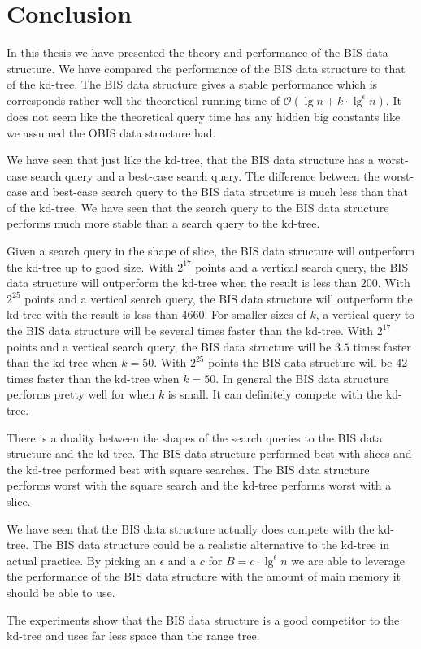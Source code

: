 \chapter{Conclusion}
\label{ch:conclusion}

In this thesis we have presented the theory and performance of the BIS data structure. We have compared the performance of the BIS data structure to that of the kd-tree. The BIS data structure gives a stable performance which is corresponds rather well the theoretical running time of $\mathcal{O}(\lg n + k\cdot\lg^\epsilon n)$. It does not seem like the theoretical query time has any hidden big constants like we assumed the OBIS data structure had.

We have seen that just like the kd-tree, that the BIS data structure has a worst-case search query and a best-case search query. The difference between the worst-case and best-case search query to the BIS data structure is much less than that of the kd-tree. We have seen that the search query to the BIS data structure performs much more stable than a search query to the kd-tree.

Given a search query in the shape of slice, the BIS data structure will outperform the kd-tree up to good size. With $2^{17}$ points and a vertical search query, the BIS data structure will outperform the kd-tree when the result is less than $200$. With $2^{25}$ points and a vertical search query, the BIS data structure will outperform the kd-tree with the result is less than $4660$. For smaller sizes of $k$, a vertical query to the BIS data structure will be several times faster than the kd-tree. With $2^{17}$ points and a vertical search query, the BIS data structure will be $3.5$ times faster than the kd-tree when $k = 50$. With $2^{25}$ points the BIS data structure will be $42$ times faster than the kd-tree when $k = 50$. In general the BIS data structure performs pretty well for when $k$ is small. It can definitely compete with the kd-tree.

There is a duality between the shapes of the search queries to the BIS data structure and the kd-tree. The BIS data structure performed best with slices and the kd-tree performed best with square searches. The BIS data structure performs worst with the square search and the kd-tree performs worst with a slice.

We have seen that the BIS data structure actually does compete with the kd-tree. The BIS data structure could be a realistic alternative to the kd-tree in actual practice. By picking an $\epsilon$ and a $c$ for $B = c\cdot\lg^\epsilon n$ we are able to leverage the performance of the BIS data structure with the amount of main memory it should be able to use.

The experiments show that the BIS data structure is a good competitor to the kd-tree and uses far less space than the range tree.
